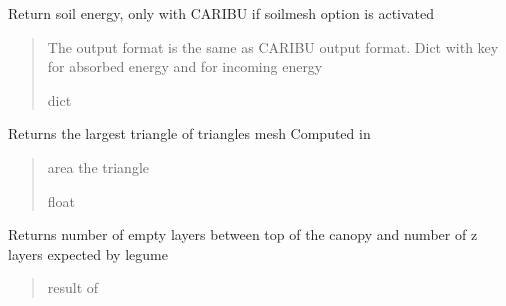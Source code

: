 \documentclass[letterpaper,10pt,english]{sphinxmanual}
\begin{document}
\begin{fulllineitems}
\begin{fulllineitems}
\label{\detokenize{reference:LVM.LightVegeManager.soilenergy}}
\pysigstartsignatures
{}
\pysigstopsignatures
\sphinxAtStartPar
Return soil energy, only with CARIBU if soilmesh option is activated
\begin{quote}\begin{description}
\sphinxAtStartPar
The output format is the same as CARIBU output format. Dict with  key for absorbed energy and  for incoming energy

\sphinxAtStartPar
dict

\end{description}\end{quote}

\end{fulllineitems}


\begin{fulllineitems}
\label{\detokenize{reference:LVM.LightVegeManager.maxtrianglearea}}
\pysigstartsignatures
{}
\pysigstopsignatures
\sphinxAtStartPar
Returns the largest triangle of triangles mesh
Computed in {\hyperref[\detokenize{reference:LVM.LightVegeManager.build}]{}}
\begin{quote}\begin{description}
\sphinxAtStartPar
area the triangle

\sphinxAtStartPar
float

\end{description}\end{quote}

\end{fulllineitems}


\begin{fulllineitems}
\label{\detokenize{reference:LVM.LightVegeManager.legume_empty_layers}}
\pysigstartsignatures
{}
\pysigstopsignatures
\sphinxAtStartPar
Returns number of empty layers between top of the canopy and number of z layers expected by l\sphinxhyphen{}egume
\begin{quote}\begin{description}
\sphinxAtStartPar
result of 


\end{description}
\end{quote}
\end{fulllineitems}
\end{fulllineitems}
\end{document}

